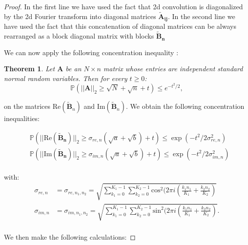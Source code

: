 \documentclass{article} %
\newtheorem{theorem}{Theorem}[section]
\theoremstyle{definition}
\begin{document}
\begin{proof}
In the first line we have used the fact that 2d convolution is diagonalized by the 2d Fourier transform into diagonal matrices $\boldsymbol{\tilde{A}_{ij}}$. In the second line we have used the fact that this concatenation of diagonal matrices can be always rearranged as a block diagonal matrix with blocks $\boldsymbol{\tilde{B}_{n}}$



We can now apply the following concentration inequality \citet{vershynin2010introduction}:
\begin{theorem}
Let $\boldsymbol{A}$ be an $N \times n$ matrix whose entries are independent standard normal random variables. Then for every $t \geq 0$:
\begin{equation}
\mathbb{P}(||\boldsymbol{A}||_2 \geq \sqrt{N} + \sqrt{n} + t) \leq e^{-t^2/2},
\end{equation}
\end{theorem}

on the matrices $\text{Re}(\boldsymbol{\tilde{B}}_n)$ and $\text{Im}(\boldsymbol{\tilde{B}}_n)$. We obtain the following concentration inequalities:

\begin{equation}
\begin{split}
& \mathbb{P}(|| \text{Re}(\boldsymbol{\tilde{B}_{n}}) ||_2 \geq \sigma_{re,n}(\sqrt{a}+\sqrt{b})+t ) \leq \exp(-t^2/2\sigma^2_{re,n}) \\
& \mathbb{P}(|| \text{Im}(\boldsymbol{\tilde{B}_{n}}) ||_2 \geq \sigma_{im,n}(\sqrt{a}+\sqrt{b})+t ) \leq \exp(-t^2/2\sigma^2_{im,n}) \\
\end{split}
\end{equation}

with:
\begin{equation}
\begin{split}
\sigma_{re,n} &= \sigma_{re,n_1,n_2} = \sqrt{ \sum_{k_1 = 0}^{K_1 - 1} \sum_{k_2 = 0}^{K_2 - 1}\text{cos}^2(2 \pi i (\frac{k_1 n_1}{K_1}+\frac{k_2 n_2}{K_2}) }\\
\sigma_{im,n} &= \sigma_{im,n_1,n_2} = \sqrt{ \sum_{k_1 = 0}^{K_1 - 1} \sum_{k_2 = 0}^{K_2 - 1}\text{sin}^2(2 \pi i (\frac{k_1 n_1}{K_1}+\frac{k_2 n_2}{K_2}) }.\\
\end{split}
\end{equation}


We then make the following calculations:


\end{proof}
\end{document}
